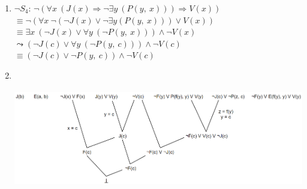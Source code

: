 \documentclass{article}
\begin{document}
\begin{enumerate}
    \item 
    $\neg S_4$: $\neg (\forall x\ (J(x) \Rightarrow \neg\exists y\ (P(y,\ x))) \Rightarrow V(x))$\\
    \hspace*{14pt}$\equiv \neg(\forall x\ \neg(\neg J(x) \vee \neg\exists y (P(y,\ x))) \vee V(x))$\\
    \hspace*{14pt}$\equiv \exists x\ (\neg J(x) \vee \forall y\ (\neg P(y,\ x))) \wedge \neg V(x)$\\
    \hspace*{12.5pt}$\leadsto (\neg J(c) \vee \forall y\ (\neg P(y,\ c))) \wedge \neg V(c)$\\
    \hspace*{14pt}$\equiv (\neg J(c) \vee \neg P(y,\ c)) \wedge \neg V(c)$
    \item
    \hspace{1pt}\\
    \includegraphics[width=15cm, height=5cm]{res2}
\end{enumerate}
\end{document}
